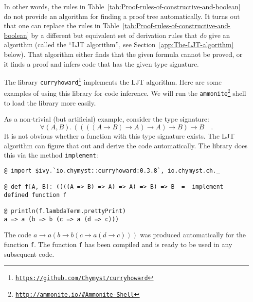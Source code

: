 In other words, the rules in Table~\ref{tab:Proof-rules-of-constructive-and-boolean}
do not provide an algorithm for finding a proof tree automatically.
It turns out that one can replace the rules in Table~\ref{tab:Proof-rules-of-constructive-and-boolean}
by a different but equivalent set of derivation rules that \emph{do}
give an algorithm (called the \textsf{``}LJT algorithm\textsf{''},
see Section~\ref{app:The-LJT-algorithm} below). That algorithm either
finds that the given formula cannot be proved, or it finds a proof
and infers code that has the given type signature.

The library \lstinline!curryhoward!\texttt{}\footnote{\texttt{\href{https://github.com/Chymyst/curryhoward}{https://github.com/Chymyst/curryhoward}}}
implements the LJT algorithm. Here are some examples of using this
library for code inference. We will run the
\lstinline!ammonite!\texttt{}\footnote{\texttt{\href{http://ammonite.io/\#Ammonite-Shell}{http://ammonite.io/\#Ammonite-Shell}}}
shell to load the library more easily.

As a non-trivial (but artificial) example, consider the type signature:
\[
\forall(A,B).\,\left(\left(\left(\left(A\rightarrow B\right)\rightarrow A\right)\rightarrow A\right)\rightarrow B\right)\rightarrow B\quad.
\]
It is not obvious whether a function with this type signature exists.
The LJT algorithm can figure that out and derive the code automatically.
The library does this via the method \lstinline!implement!:
\begin{lstlisting}
@ import $ivy.`io.chymyst::curryhoward:0.3.8`, io.chymyst.ch._

@ def f[A, B]: ((((A => B) => A) => A) => B) => B  =  implement
defined function f

@ println(f.lambdaTerm.prettyPrint)
a => a (b => b (c => a (d => c)))
\end{lstlisting}
The code $a\rightarrow a\left(b\rightarrow b\left(c\rightarrow a\left(d\rightarrow c\right)\right)\right)$
was produced automatically for the function \lstinline!f!. The function
\lstinline!f! has been compiled and is ready to be used in any subsequent
code.

